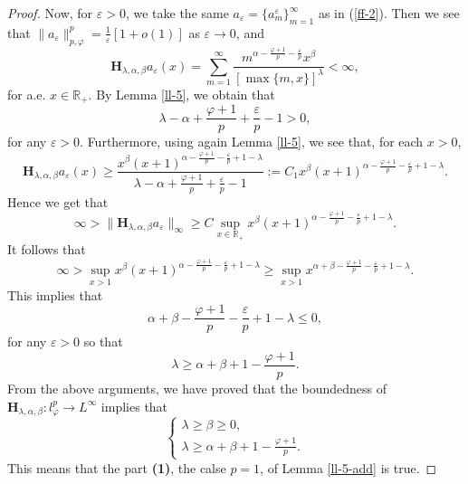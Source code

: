 \documentclass[10pt]{amsart}
\theoremstyle{definition}    %
\numberwithin{equation}{section}
\begin{document}
\begin{proof}
Now, for $\varepsilon>0$, we take the same $a_{\varepsilon}=\{a_m^{\varepsilon}\}_{m=1}^{\infty}$ as in (\ref{ff-2}). Then we see that
$\|a_{\varepsilon}\|_{p, \varphi}^p=\frac{1}{\varepsilon}[1+o(1)]$ as $\varepsilon \rightarrow 0$, and 
 \begin{equation}
\mathbf{H}_{\lambda, \alpha, \beta}a_{\varepsilon}(x)=\sum_{m=1}^{\infty}\frac{m^{\alpha-\frac{\varphi+1}{p}-\frac{\varepsilon}{p}}x^{\beta}}{[\max\{m,x\}]^{\lambda}}<\infty,\nonumber 
\end{equation}  
for a.e. $x\in \mathbb{R}_{+}$. By Lemma \ref{ll-5}, we obtain that
$$\lambda-\alpha+\frac{\varphi+1}{p}+\frac{\varepsilon}{p}-1>0,$$
for any $\varepsilon>0$. %
Furthermore, using again Lemma \ref{ll-5}, we see that, for each $x>0$, 
 \begin{equation}
\mathbf{H}_{\lambda, \alpha, \beta}a_{\varepsilon}(x)\geq \frac{x^{\beta}(x+1)^{\alpha-\frac{\varphi+1}{p}-\frac{\varepsilon}{p}+1-\lambda}}{\lambda-\alpha+\frac{\varphi+1}{p}+\frac{\varepsilon}{p}-1}:=C_1x^{\beta}(x+1)^{\alpha-\frac{\varphi+1}{p}-\frac{\varepsilon}{p}+1-\lambda}.\nonumber 
\end{equation} 
Hence we get that
$$\infty>\|\mathbf{H}_{\lambda, \alpha, \beta}a_{\varepsilon}\|_{\infty} \geq C \sup_{x\in \mathbb{R}_{+}}x^{\beta}(x+1)^{\alpha-\frac{\varphi+1}{p}-\frac{\varepsilon}{p}+1-\lambda}.$$
It follows that 
$$\infty>\sup_{x>1} x^{\beta}(x+1)^{\alpha-\frac{\varphi+1}{p}-\frac{\varepsilon}{p}+1-\lambda}\geq \sup_{x>1}x^{\alpha+\beta-\frac{\varphi+1}{p}-\frac{\varepsilon}{p}+1-\lambda}.$$
This implies that
$$\alpha+\beta-\frac{\varphi+1}{p}-\frac{\varepsilon}{p}+1-\lambda \leq 0,$$
for any $\varepsilon>0$ so that
\begin{equation}\label{ad-eq-3}\lambda\geq \alpha+\beta+1-\frac{\varphi+1}{p}.\end{equation}
From the above arguments, we have proved that the boundedness of $\mathbf{H}_{\lambda, \alpha, \beta}: l_{\varphi}^p \rightarrow L^{\infty}$ implies that  
\begin{equation} 
\begin{cases}
\lambda\geq \beta\geq 0, \\
\lambda\geq \alpha+\beta+1-\frac{\varphi+1}{p}. \nonumber 
\end{cases}
\end{equation}
This means that the part {\bf (1)}, the calse $p=1$, of Lemma \ref{ll-5-add} is true. 


\end{proof}
\end{document}
